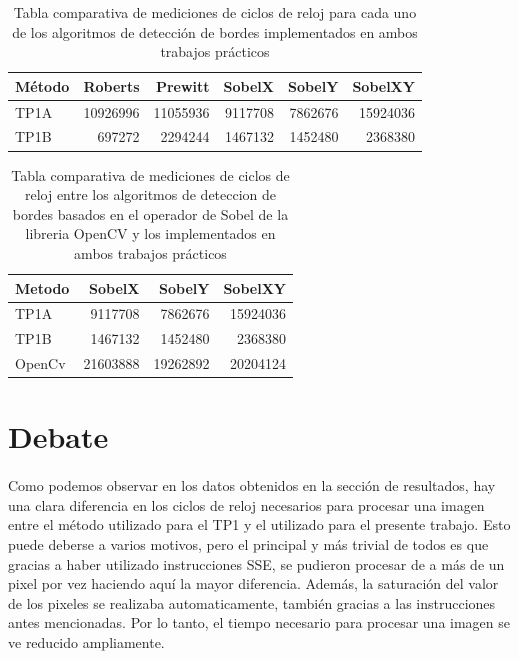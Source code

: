 \documentclass[11pt, a4paper]{article}
\begin{document}
\begin{table}[ht] %
\centering %
\begin{tabular}{|l|r|r|r|r|r|}
\hline
M\'etodo & Roberts & Prewitt & SobelX & SobelY & SobelXY \\
\hline
TP1A & 10926996 & 11055936 & 9117708 & 7862676 & 15924036 \\
\hline
TP1B & 697272 & 2294244 & 1467132 & 1452480 & 2368380 \\
\hline
\end{tabular}

\caption{Tabla comparativa de mediciones de ciclos de reloj para cada uno de los algoritmos de detecci\'on de bordes implementados en ambos trabajos pr\'acticos} %
\label{Tiempo metodos} %
\end{table}
\vspace{30pt}

\begin{table}[ht] %
\centering %
\begin{tabular}{|l|r|r|r|}
\hline
Metodo & SobelX & SobelY & SobelXY \\
\hline
TP1A & 9117708 & 7862676 & 15924036 \\
\hline
TP1B & 1467132 & 1452480 & 2368380 \\
\hline
OpenCv & 21603888 & 19262892 & 20204124 \\
\hline



\end{tabular}

\caption{Tabla comparativa de mediciones de ciclos de reloj entre los algoritmos de deteccion de bordes basados en el operador de Sobel de la libreria OpenCV y los implementados en ambos trabajos pr\'acticos} %
\label{Tiempo comparacion} %
\end{table}


\newpage
\section{Debate}
\paragraph{}
Como podemos observar en los datos obtenidos en la secci\'on de resultados, hay una clara diferencia en los ciclos de reloj necesarios para procesar una imagen entre el m\'etodo utilizado para el TP1 y el utilizado para el presente trabajo. Esto puede deberse a varios motivos, pero el principal y m\'as trivial de todos es que gracias a haber utilizado instrucciones SSE, se pudieron procesar de a m\'as de un pixel por vez haciendo aqu\'i la mayor diferencia. Adem\'as, la saturaci\'on del valor de los pixeles se realizaba automaticamente, tambi\'en gracias a las instrucciones antes mencionadas. Por lo tanto, el tiempo necesario para procesar una imagen se ve reducido ampliamente.
\end{document}
